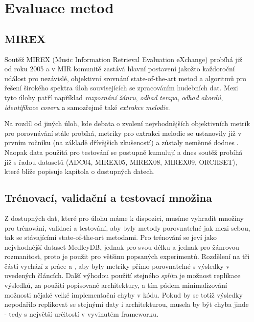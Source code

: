 \chapter{Evaluace metod}

\section{MIREX}

Soutěž MIREX (Music Information Retrieval Evaluation eXchange) probíhá již od roku 2005 a v MIR komunitě zastává hlavní postavení jakožto každoroční událost pro nezávislé, objektivní srovnání state-of-the-art metod a algoritmů pro řešení širokého spektra úloh souvisejících se zpracováním hudebních dat. Mezi tyto úlohy patří například \textit{rozpoznání žánru}, \textit{odhad tempa}, \textit{odhad akordů}, \textit{identifikace coveru} a samozřejmě také \textit{extrakce melodie}.

Na rozdíl od jiných úloh, kde debata o zvolení nejvhodnějších objektivních metrik pro porovnávání stále probíhá, metriky pro extrakci melodie se ustanovily již v prvním ročníku (na základě dřívějších zkušeností) a zůstaly neměnné dodnes \cite{Raffel2014}. Naopak data použitá pro testování se postupně kumulují a dnes soutěž probíhá již s řadou datasetů (ADC04, MIREX05, MIREX08, MIREX09, ORCHSET), které blíže popisuje kapitola o dostupných datech.

\cite{Downie2010}

\section{Trénovací, validační a testovací množina}

Z dostupných dat, které pro úlohu máme k dispozici, musíme vyhradit množiny pro trénování, validaci a testování, aby byly metody porovnatelné jak mezi sebou, tak se stávajícími state-of-the-art metodami. Pro trénování se jeví jako nejvhodnější dataset MedleyDB, jednak pro svou délku a jednak pro žánrovou rozmanitost, proto je použit pro většinu popsaných experimentů. Rozdělení na tři části vychází z práce \cite{Bittner2017} a \cite{DBasaranSEssid2018}, aby byly metriky přímo porovnatelné s výsledky v uvedených článcích. Další výhodou použití stejného \textit{splitu} je možnost replikace výsledků, za použití popisované architektury, a tím pádem minimalizování možnosti nějaké velké implementační chyby v kódu. Pokud by se totiž výsledky nepodařilo replikovat se stejnými daty i architekturou, musela by být chyba jinde - tedy s největší určitostí v vyvinutém frameworku.

